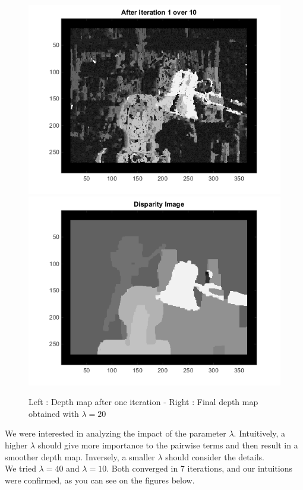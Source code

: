\documentclass[11pt,a4paper]{article}
\begin{document}
\begin{figure}[H]
	\centering
	\noindent\includegraphics[scale=0.4]{results/one_iter.png}
	\noindent\includegraphics[scale=0.4]{results/disparity_est.png}
	\caption{Left : Depth map after one iteration - Right : Final depth map obtained with $\lambda = 20$}
\end{figure}

We were interested in analyzing the impact of the parameter $\lambda$. Intuitively, a higher $\lambda$ should give more importance to the pairwise terms and then result in a smoother depth map. Inversely, a smaller $\lambda$ should consider the details.
\\We tried $\lambda = 40$ and $\lambda = 10$. Both converged in 7 iterations, and our intuitions were confirmed, as you can see on the figures below.
\end{document}
